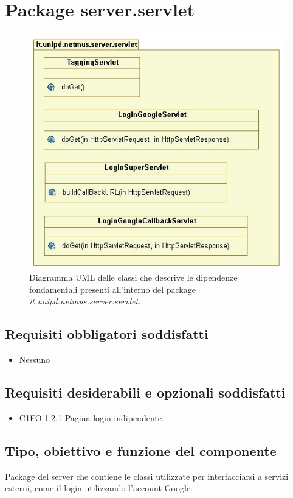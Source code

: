 \newpage
\section{Package server.servlet}

\begin{figure}[!h]
  \centering
  \includegraphics[width=11cm]{img/DP/classes_servlet.png}
\caption{Diagramma UML delle classi che descrive le dipendenze
fondamentali presenti all'interno del package
\emph{it.unipd.netmus.server.servlet}.}
\end{figure}

\subsection*{Requisiti obbligatori soddisfatti}
\begin{itemize}
	\item Nessuno
\end{itemize}
\subsection*{Requisiti desiderabili e opzionali soddisfatti}
\begin{itemize}
    \item C1FO-1.2.1 Pagina login indipendente
\end{itemize}
\subsection*{Tipo, obiettivo e funzione del componente}
Package del server che contiene le classi utilizzate per interfacciarsi a
servizi esterni, come il login utilizzando l'account Google.
